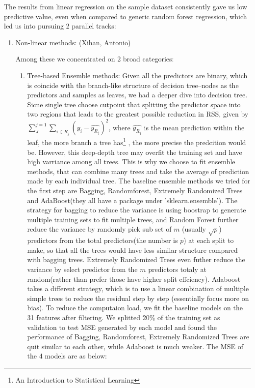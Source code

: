 \documentclass[11pt]{article}
\begin{document}
The results from linear regression on the sample dataset consistently gave us low predictive value, even when compared to generic random forest regression, which led us into pursuing 2 parallel tracks:

\begin{enumerate}

\item Non-linear methods: (Xihan, Antonio)

Among these we concentrated on 2 broad categories:

\begin{enumerate}

\item Tree-based Ensemble methods: Given all the predictors are binary, which is coincide with the branch-like structure of decision tree--nodes as the predictors and samples as leaves, we had a deeper dive into decision tree. Sicne single tree choose cutpoint that splitting the predictor space into two regions that leads to the greatest possible reduction in RSS, given by $\sum_{J}^{j=1}\sum_{i\in R_{j}}(y_{i}-\hat{y_{R_{j}}})^{2}$, where $\hat{y_{R_{j}}}$ is the mean prediction within the leaf, the more branch a tree has\footnote{An Introduction to Statistical Learning} , the more precise the predcition would be. However, this deep-depth tree may overfit the training set and have high varriance among all trees. This is why we choose to fit ensemble methods, that can combine many trees and take the average of prediction made by each individual tree. The baseline ensemble methods we tried for the first step are Bagging, Randomforest, Extremely Randomized Trees and AdaBoost(they all have a package under 'sklearn.ensemble'). The strategy for bagging to reduce the variance is using boostrap to generate multiple training sets to fit multiple trees, and Random Forest further reduce the variance by randomly pick sub set of $\mathit{m}$ (usually $\sqrt{p}$) predictors from the total predictors(the number is $\mathit{p}$) at each split to make, so that all the trees would have less similar structure compared with bagging trees. Extremely Randomized Trees even futher reduce the variance by select predictor from the $\mathit{m}$ predictors totaly at random(rather than prefer those have higher split effciency). Adaboost takes a different strategy, which is to use a linear combination of multiple simple trees to reduce the residual step by step (essentially focus more on bias). To reduce the computaion load, we fit the baseline models on the 31 features after filtering. We splitted 20\% of the training set as validation to test MSE generated by each model and found the performance of Bagging, Randomforest, Extremely Randomized Trees are quit similar to each other, while Adaboost is much weaker. The MSE of the 4 models are as below: 


\end{enumerate}
\end{enumerate}
\end{document}
